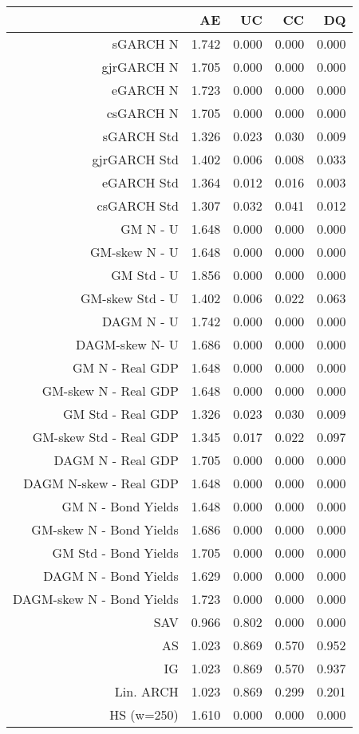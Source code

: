 \documentclass{article}
\begin{document}


\begin{table}[ht]
\centering
\begin{tabular}{rrrrr}
  \hline
 & AE & UC & CC & DQ \\ 
  \hline
sGARCH N & 1.742 & 0.000 & 0.000 & 0.000 \\ 
  gjrGARCH N & 1.705 & 0.000 & 0.000 & 0.000 \\ 
  eGARCH N & 1.723 & 0.000 & 0.000 & 0.000 \\ 
  csGARCH N & 1.705 & 0.000 & 0.000 & 0.000 \\ 
  sGARCH Std & 1.326 & 0.023 & 0.030 & 0.009 \\ 
  gjrGARCH Std & 1.402 & 0.006 & 0.008 & 0.033 \\ 
  eGARCH Std & 1.364 & 0.012 & 0.016 & 0.003 \\ 
  csGARCH Std & 1.307 & 0.032 & 0.041 & 0.012 \\ 
  GM N - U & 1.648 & 0.000 & 0.000 & 0.000 \\ 
  GM-skew N - U & 1.648 & 0.000 & 0.000 & 0.000 \\ 
  GM Std - U & 1.856 & 0.000 & 0.000 & 0.000 \\ 
  GM-skew Std - U & 1.402 & 0.006 & 0.022 & 0.063 \\ 
  DAGM N - U & 1.742 & 0.000 & 0.000 & 0.000 \\ 
  DAGM-skew  N- U & 1.686 & 0.000 & 0.000 & 0.000 \\ 
  GM N - Real GDP & 1.648 & 0.000 & 0.000 & 0.000 \\ 
  GM-skew N - Real GDP & 1.648 & 0.000 & 0.000 & 0.000 \\ 
  GM Std - Real GDP & 1.326 & 0.023 & 0.030 & 0.009 \\ 
  GM-skew Std - Real GDP & 1.345 & 0.017 & 0.022 & 0.097 \\ 
  DAGM N - Real GDP & 1.705 & 0.000 & 0.000 & 0.000 \\ 
  DAGM N-skew - Real GDP & 1.648 & 0.000 & 0.000 & 0.000 \\ 
  GM N - Bond Yields & 1.648 & 0.000 & 0.000 & 0.000 \\ 
  GM-skew N - Bond Yields & 1.686 & 0.000 & 0.000 & 0.000 \\ 
  GM Std - Bond Yields & 1.705 & 0.000 & 0.000 & 0.000 \\ 
  DAGM N - Bond Yields & 1.629 & 0.000 & 0.000 & 0.000 \\ 
  DAGM-skew N - Bond Yields & 1.723 & 0.000 & 0.000 & 0.000 \\ 
  SAV & 0.966 & 0.802 & 0.000 & 0.000 \\ 
  AS & 1.023 & 0.869 & 0.570 & 0.952 \\ 
  IG & 1.023 & 0.869 & 0.570 & 0.937 \\ 
  Lin. ARCH & 1.023 & 0.869 & 0.299 & 0.201 \\ 
  HS (w=250) & 1.610 & 0.000 & 0.000 & 0.000 \\ 
   \hline
\end{tabular}
\end{table}
\end{document}
